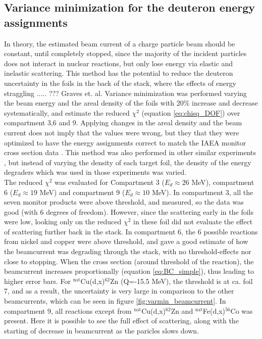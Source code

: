 \subsection{Variance minimization for the deuteron energy assignments}
In theory, the estimated beam current of a charge particle beam should be constant, until completely stopped, since the majority of the incident particles does not interact in nuclear reactions, but only lose energy via elastic and inelastic scattering. This method has the potential to reduce the deuteron uncertainty in the foils in the back of the stack, where the effects of energy straggling ..... ??? Graves et. al. Variance minimization was performed varying the beam energy and the areal density of the foils with 20\% increase and decrease systematically, and estimate the reduced $\chi^2$ (equation \ref{eq:chisq_DOF}) over compartment 3,6 and 9. Applying changes in the areal density and the beam current does not imply that the values were wrong, but they that they were optimized to have the energy assignments correct to match the IAEA monitor cross section data \cite{Morrell2020}. This method was also performed in other similar experiments \cite{Graves2016, Voyles2018c, Voyles2019, Morell2020}, but instead of varying the density of each target foil, the density of the energy degraders which was used in those experiments was varied. \\ 

The reduced $\chi^2$ was evaluated for Compartment 3 ($E_d\approx 26 $ MeV), compartment 6 ($E_d \approx 19$ MeV) and compartment 9 ($E_d\approx 10$ MeV). In compartment 3, all the seven monitor products were above threshold, and measured, so the data was good (with 6 degrees of freedom). However, since the scattering early in the foils were low, looking only on the reduced $\chi^2$ in these foil did not evaluate the effect of scattering further back in the stack. In compartment 6, the 6 possible reactions from nickel and copper were above threshold, and gave a good estimate of how the beamcurrent was degrading through the stack, with no threshold-effects nor close to stopping. When the cross section (around threshold of the reaction), the beamcurrent increases proportionally (equation \ref{eq:BC_simple}), thus leading to higher error bars. For $^\text{nat}$Cu(d,x)$^{62}$Zn (Q=-15.5 MeV), the threshold is at ca. foil 7, and as a result, the uncertainty is very large in comparison to the other beamcurrents, which can be seen in figure \ref{fig:varmin_beamcurrent}. In compartment 9, all reactions except from $^\text{nat}$Cu(d,x)$^{62}$Zn and $^\text{nat}$Fe(d,x)$^{56}$Co was present. Here it is possible to see the full effect of scattering, along with the starting of decrease in beamcurrent as the paricles slows down. \\


